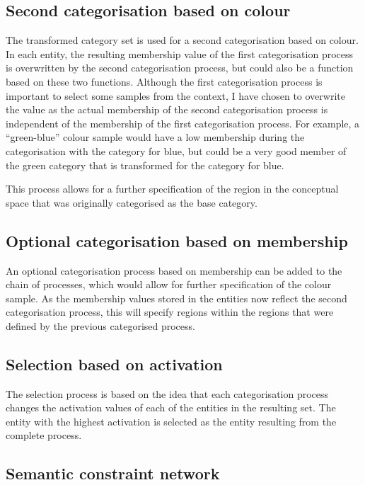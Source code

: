 \subsection{Second categorisation based on colour}

The transformed category set is used for a second categorisation based
on colour. In each entity, the resulting membership value of the first
categorisation process is overwritten by the second categorisation
process, but could also be a function based on these two
functions. Although the first categorisation process is important to
select some samples from the context, I have chosen to overwrite the
value as the actual membership of the second categorisation process
is independent of the membership of the first categorisation
process. For example, a ``green-blue'' colour sample would have a low
membership during the categorisation with the category for blue, but
could be a very good member of the green category that is transformed
for the category for blue.

This process allows for a further specification of the region in the
conceptual space that was originally categorised as the base category.

\subsection{Optional categorisation based on membership}

An optional categorisation process based on membership can be added to
the chain of processes, which would allow for further specification of
the colour sample. As the membership values stored in the entities now
reflect the second categorisation process, this will specify regions
within the regions that were defined by the previous categorised
process.

\subsection{Selection based on activation}

The selection process is based on the idea that each categorisation
process changes the activation values of each of the entities in the
resulting set. The entity with the highest activation is selected as
the entity resulting from the complete process.

\subsection{Semantic constraint network}

